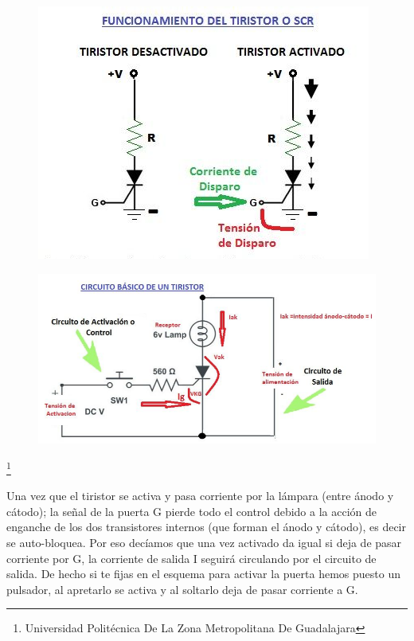 \documentclass[11pt,a4paper]{article}
\begin{document}
\begin{figure}[hbtp]
\centering
\includegraphics[scale=0.70]{ACTIVACION.png}
\end{figure} 
\begin{figure}[hbtp]
\centering
\includegraphics[scale=0.40]{ca-cd.png}
\end{figure}

\footnote{Universidad Politécnica De La Zona Metropolitana De Guadalajara} 
 
\pagebreak

Una vez que el tiristor se activa y pasa corriente por la lámpara (entre ánodo y cátodo); la señal de la puerta G pierde todo el control debido a la acción de enganche de los dos transistores internos (que forman el ánodo y cátodo), es decir se auto-bloquea. Por eso decíamos que una vez activado da igual si deja de pasar corriente por G, la corriente de salida I seguirá circulando por el circuito de salida. De hecho si te fijas en el esquema para activar la puerta hemos puesto un pulsador, al apretarlo se activa y al soltarlo deja de pasar corriente a G.\\
\end{document}
